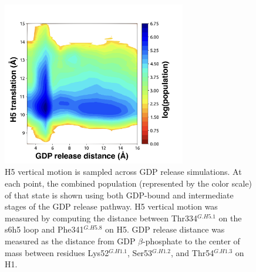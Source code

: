 \documentclass[../main.tex]{subfiles}
\begin{document}
    \begin{figure}[!htb] %
        \centering
        \includegraphics[width=3.16in]{ch4-fig3-supp2.png}
        \caption[H5 vertical motion is sampled across GDP release simulations.]
            {H5 vertical motion is sampled across GDP release simulations. At each point, the combined population (represented by the color scale) of that state is shown using both GDP-bound and intermediate stages of the GDP release pathway. H5 vertical motion was measured by computing the distance between Thr334$^{G.H5.1}$ on the s6h5 loop and Phe341$^{G.H5.8}$ on H5. GDP release distance was measured as the distance from GDP $\beta$-phosphate to the center of mass between residues Lys52$^{G.H1.1}$, Ser53$^{G.H1.2}$, and Thr54$^{G.H1.3}$ on H1.}
        \label{fig:ch4-fig3-supp2}
    \end{figure}
\end{document}
